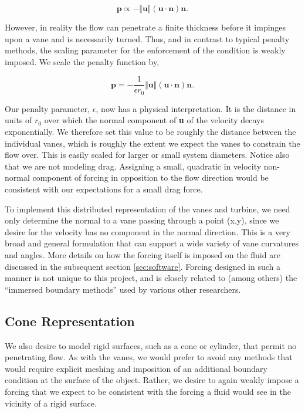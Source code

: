 \begin{equation}
 \textbf{p} \propto -\Vert \textbf{u} \Vert \left(\textbf{u} \cdot
					     \textbf{n} \right) 
  \textbf{n}.
\end{equation}

However, in reality the flow can penetrate a finite thickness
before it impinges upon a vane and is necessarily turned. Thus, and in
contrast to typical penalty methods, the scaling parameter for the
enforcement of the condition is weakly imposed. We scale the penalty
function by, 

\begin{equation}
 \textbf{p} = - \frac{1}{\epsilon r_0} \Vert \textbf{u} \Vert
  \left(\textbf{u} \cdot \textbf{n}\right) \textbf{n}.
\end{equation}

Our penalty parameter, $\epsilon$, now has a physical interpretation.
It is the distance in units of $r_0$ over which the normal component
of \textbf{u} of the velocity decays exponentially. We therefore set
this value to be roughly the distance between the individual vanes,
which is roughly the extent we expect the vanes to constrain the flow
over. This is easily scaled for larger or small system diameters. 
Notice also that we are not modeling drag. Assigning a small, quadratic
in velocity non-normal component of forcing in opposition to the flow direction
would be consistent with our expectations for a small drag force. 

To implement this distributed representation of the vanes and turbine,
we need only determine the normal to a vane passing through a
point (x,y), since we desire for the velocity has no component in the
normal direction. This is a very broad and general formulation that can
support a wide variety of vane curvatures and angles. More details on
how the forcing itself is imposed on the fluid are discussed in the
subsequent section \ref{sec:software}. Forcing designed in such a manner
is not unique to this project, and is closely related to (among others)
the ``immersed boundary methods'' used by various other
researchers\cite{doi:10.1146/annurev.fluid.37.061903.175743}. 

\subsection{Cone Representation}

We also desire to model rigid surfaces, such as a cone or cylinder, that
permit no penetrating flow. As with the vanes, we would prefer to avoid
any methods that would require explicit meshing and imposition of an
additional boundary condition at the surface of the object. Rather, we
desire to again weakly impose a forcing that we expect to be consistent
with the forcing a fluid would see in the vicinity of a rigid surface. 

